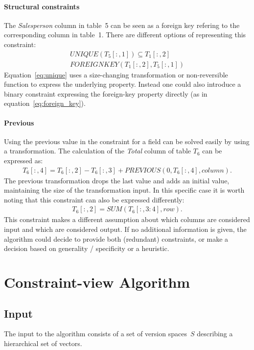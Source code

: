 \documentclass[a4paper]{article}
\newcommand{\range}[3]{#1[#2,#3]}
\newcommand{\rangeto}[2]{#1{:}#2}
\newcommand{\rangeall}{:}
\begin{document}
\paragraph{Structural constraints}
The \textit{Salesperson} column in table~5 can be seen as a foreign key refering to the corresponding column in table~1.
There are different options of representing this constraint:
\begin{align}
	\mathit{UNIQUE}(\range{T_5}{\rangeall}{1}) \subseteq \range{T_1}{\rangeall}{2} \label{eq:unique}\\
	\mathit{FOREIGNKEY}(\range{T_1}{\rangeall}{2}, \range{T_5}{\rangeall}{1}) \label{eq:foreign_key}
\end{align}
Equation~\ref{eq:unique} uses a size-changing transformation or non-reversible function to express the underlying property.
Instead one could also introduce a binary constraint expressing the foreign-key property directly (as in equation~\ref{eq:foreign_key}).

\paragraph{Previous} Using the previous value in the constraint for a field can be solved easily by using a transformation.
The calculation of the \textit{Total} column of table $T_6$ can be expressed as:
\begin{align}
	\range{T_6}{\rangeall}{4} = \range{T_6}{\rangeall}{2} - \range{T_6}{\rangeall}{3} + \mathit{PREVIOUS}(0, \range{T_6}{\rangeall}{4}, column).
\end{align}
The previous transformation drops the last value and adds an initial value, maintaining the size of the transformation input.
In this specific case it is worth noting that this constraint can also be expressed differently:
\begin{align}
	\range{T_6}{\rangeall}{2} = \mathit{SUM}(\range{T_6}{\rangeall}{\rangeto{3}{4}}, row).
\end{align}
This constraint makes a different assumption about which columns are considered input and which are considered output.
If no additional information is given, the algorithm could decide to provide both (redundant) constraints, or make a decision based on generality / specificity or a heuristic.

\section{Constraint-view Algorithm}
\subsection{Input}
The input to the algorithm consists of a set of version spaces~$S$ describing a hierarchical set of vectors.
\end{document}
